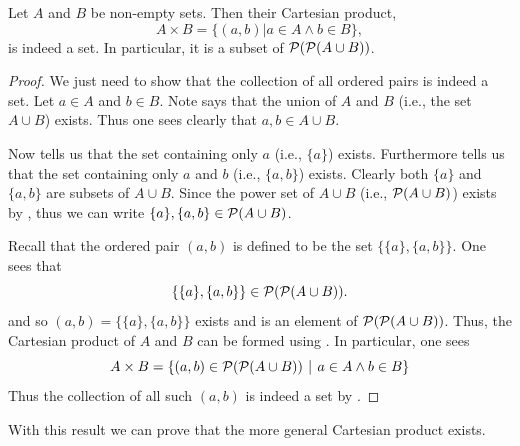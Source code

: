 \begin{lemma}\label{lemma:cartesian-product-of-two-sets-is-a-set}
    Let $A$ and $B$ be non-empty sets. Then their Cartesian product,
    \[
        A \times B = \{(a, b) \vert a \in A \land b \in B\},
    \]
    is indeed a set. In particular, it is a subset of ${\mathcal{P}({\mathcal{P}(A\cup B)})}$.
\end{lemma}
\begin{proof}
    We just need to show that the collection of all ordered pairs is indeed a set. Let $a \in A$ and $b \in B$. Note  says that the union of $A$ and $B$ (i.e., the set $A \cup B$) exists. Thus one sees clearly that $a, b \in A \cup B$.

    Now  tells us that the set containing only $a$ (i.e., $\{a\}$) exists. Furthermore  tells us that the set containing only $a$ and $b$ (i.e., $\{a, b\}$) exists. Clearly both $\{a\}$ and $\{a, b\}$ are subsets of $A \cup B$. Since the power set of $A \cup B$ (i.e., ${\mathcal{P}(A \cup B)}$) exists by , thus we can write $\{a\}, \{a, b\} \in {\mathcal{P}(A \cup B)}$.

    Recall that the ordered pair $(a, b)$ is defined to be the set $\{\{a\}, \{a, b\}\}$. One sees that
    \[
        \{\{a\}, \{a, b\}\} \in {\mathcal{P}({\mathcal{P}(A \cup B)})}.
    \]
    and so $(a, b) = \{\{a\}, \{a, b\}\}$ exists and is an element of ${\mathcal{P}({\mathcal{P}(A \cup B)})}$. Thus, the Cartesian product of $A$ and $B$ can be formed using . In particular, one sees
    \[
        A \times B = \left\{(a,b) \in \Power{\Power{A \cup B}} \vert a \in A \land b \in B \right\}
    \]
    Thus the collection of all such $(a,b)$ is indeed a set by .
\end{proof}

With this result we can prove that the more general Cartesian product exists.

